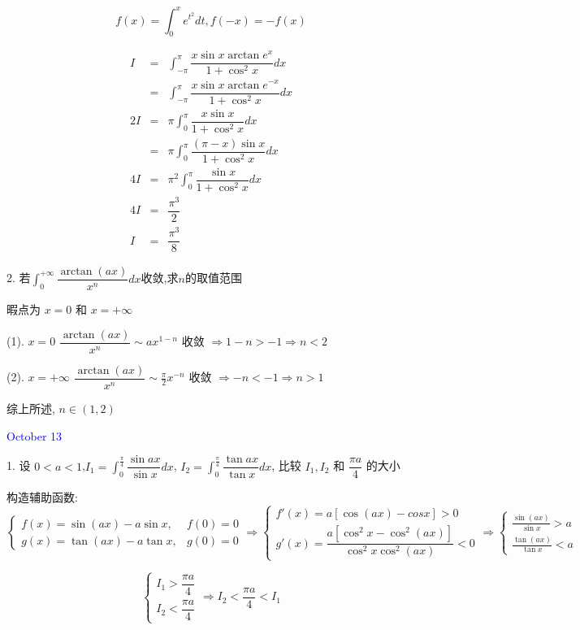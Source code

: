 \begin{solution}

	$$f(x) = \int_{0}^{x}e^{t^{2}}dt, f(-x) = -f(x)$$
	
	\begin{eqnarray*}
		I & = & \int_{-\pi}^{\pi}\dfrac{x\sin x\arctan e^x}{1+\cos^2 x}dx\\
		  & = & \int_{-\pi}^{\pi}\dfrac{x\sin x\arctan e^{-x}}{1+\cos^2 x}dx\\
	   2I & = & \pi\int_{0}^{\pi}\dfrac{x\sin x}{1+\cos^2 x}dx\\
		  & = & \pi\int_{0}^{\pi}\dfrac{(\pi-x)\sin x}{1+\cos^2 x}dx\\
	   4I & = & \pi^2\int_{0}^{\pi}\dfrac{\sin x}{1+\cos^2 x}dx\\
	   4I & = & \dfrac{\pi^3}{2}\\
		I & = & \dfrac{\pi^3}{8}
	\end{eqnarray*}
\end{solution}


2. 若$\int_{0}^{+\infty}\dfrac{\arctan(ax)}{x^n}dx$收敛,求$n$的取值范围

\begin{solution}

	暇点为 $x = 0$ 和 $x = +\infty$
	
	(1). $x=0$ $\dfrac{\arctan (ax)}{x^n}\sim ax^{1-n}$ 收敛 $\Rightarrow 1-n>-1\Rightarrow n<2$
	
	(2). $x=+\infty$ $\dfrac{\arctan (ax)}{x^n}\sim \frac{\pi}{2}x^{-n}$ 收敛 $\Rightarrow -n<-1\Rightarrow n>1$
	
	综上所述, $n\in(1,2)$
\end{solution}


\textcolor{blue}{October 13}

1. 设 $0<a<1$,$\displaystyle{I_{1}=\int_{0}^{\frac{\pi}{4}}\dfrac{\sin ax}{\sin x}dx}$,
$\displaystyle{I_{2}=\int_{0}^{\frac{\pi}{4}}\dfrac{\tan ax}{\tan x}dx}$,
比较 $I_{1},I_{2}$ 和 $\dfrac{\pi a}{4}$ 的大小

\begin{solution}

	构造辅助函数: 
	$$\begin{cases}
		f(x) = \sin(ax) - a\sin x, & f(0) = 0 \\
		g(x) = \tan(ax) - a\tan x, & g(0) = 0
	\end{cases}\Rightarrow 
	\begin{cases} 
		f'(x) = a[\cos(ax) - cos x] > 0\\
		g'(x) = \dfrac{a[\cos^{2}x-\cos^{2}(ax)]}{\cos^{2}x\cos^{2}(ax)} < 0
	\end{cases}\Rightarrow 
	\begin{cases}
		\frac{\sin(ax)}{\sin x} > a\\
		\frac{\tan(ax)}{\tan x} < a
	\end{cases}$$
	
	$$\begin{cases}
		I_{1} > \dfrac{\pi a}{4}\\
		I_{2} < \dfrac{\pi a}{4}
	\end{cases}\Rightarrow I_{2} < \dfrac{\pi a}{4} < I_{1}$$
\end{solution}


